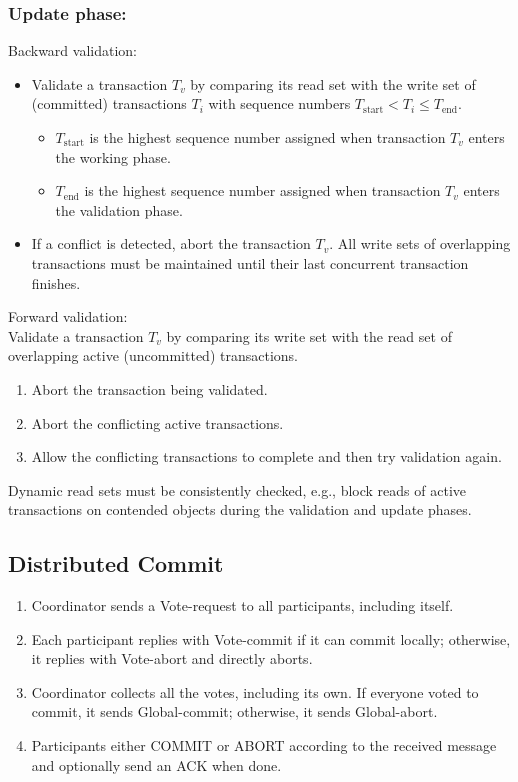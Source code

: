 \subsubsection{Update phase:}
Backward validation:
\begin{itemize}
\item Validate a transaction \( T_v \) by comparing its read set with the write set of (committed) transactions \( T_i \) with sequence numbers \( T_{\text{start}} < T_i \leq T_{\text{end}} \).
\begin{itemize}
\item \( T_{\text{start}} \) is the highest sequence number assigned when transaction \( T_v \) enters the working phase.
\item \( T_{\text{end}} \) is the highest sequence number assigned when transaction \( T_v \) enters the validation phase.
\end{itemize}
\item If a conflict is detected, abort the transaction \( T_v \). All write sets of overlapping transactions must be maintained until their last concurrent transaction finishes.
\end{itemize}
Forward validation:
\\
 Validate a transaction \( T_v \) by comparing its write set with the read set of overlapping active (uncommitted) transactions.
\begin{enumerate}
\item Abort the transaction being validated.
\item Abort the conflicting active transactions.
\item Allow the conflicting transactions to complete and then try validation again.
\end{enumerate}

Dynamic read sets must be consistently checked, e.g., block reads of active transactions on contended objects during the validation and update phases.


\subsection{Distributed Commit}
\begin{enumerate}
    \item Coordinator sends a Vote-request to all participants, including itself.
    
    \item Each participant replies with Vote-commit if it can commit locally; otherwise, it replies with Vote-abort and directly aborts.
    
    \item Coordinator collects all the votes, including its own. If everyone voted to commit, it sends Global-commit; otherwise, it sends Global-abort.
    
    \item Participants either COMMIT or ABORT according to the received message and optionally send an ACK when done.
\end{enumerate}

